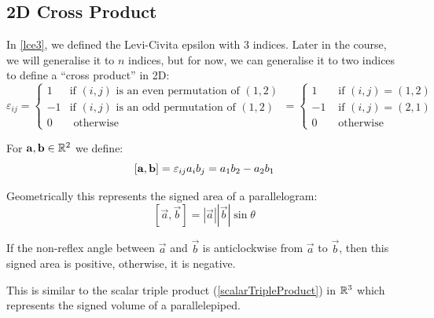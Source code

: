 \documentclass[../main.tex]{subfiles}
\begin{document}
\subsection{2D Cross Product}
In \cref{lce3}, we defined the Levi-Civita epsilon with 3 indices.
Later in the course, we will generalise it to $n$ indices, but for now, we can generalise it to two indices to define a ``cross product'' in 2D:
\[
  \varepsilon_{i j} = \begin{cases}
  1 & \text{if $(i, j)$ is an even permutation of $(1, 2)$} \\
  -1 & \text{if $(i, j)$ is an odd permutation of $(1, 2)$} \\
  0 & \text{ otherwise}
  \end{cases} = \begin{cases}
  1 & \text{ if } (i, j) = (1, 2) \\
  -1 & \text{ if } (i, j) = (2, 1) \\
  0 & \text{ otherwise}
  \end{cases}
\]
\begin{definition}
  For $\mathbf{\bm{a}}, \mathbf{\bm{b}} \in \mathbb{R}^2$ we define: \label{scalarCrossProduct}
  \[
    [\mathbf{\bm{a}}, \mathbf{\bm{b}}] = \varepsilon_{i j}a_i b_j = a_1 b_2 - a_2 b_1
  \]
\end{definition}
Geometrically this represents the signed area of a parallelogram:
\[
  [\vec{a}, \vec{b}] = |\vec{a}||\vec{b}|\sin\theta
\]
\begin{center}
\end{center}
If the non-reflex angle between $\vec{a}$ and $\vec{b}$ is anticlockwise from $\vec{a}$ to $\vec{b}$, then this signed area is positive, otherwise, it is negative.

This is similar to the scalar triple product (\cref{scalarTripleProduct}) in  $\mathbb{R}^{3}$ which represents the signed volume of a parallelepiped.
\end{document}
